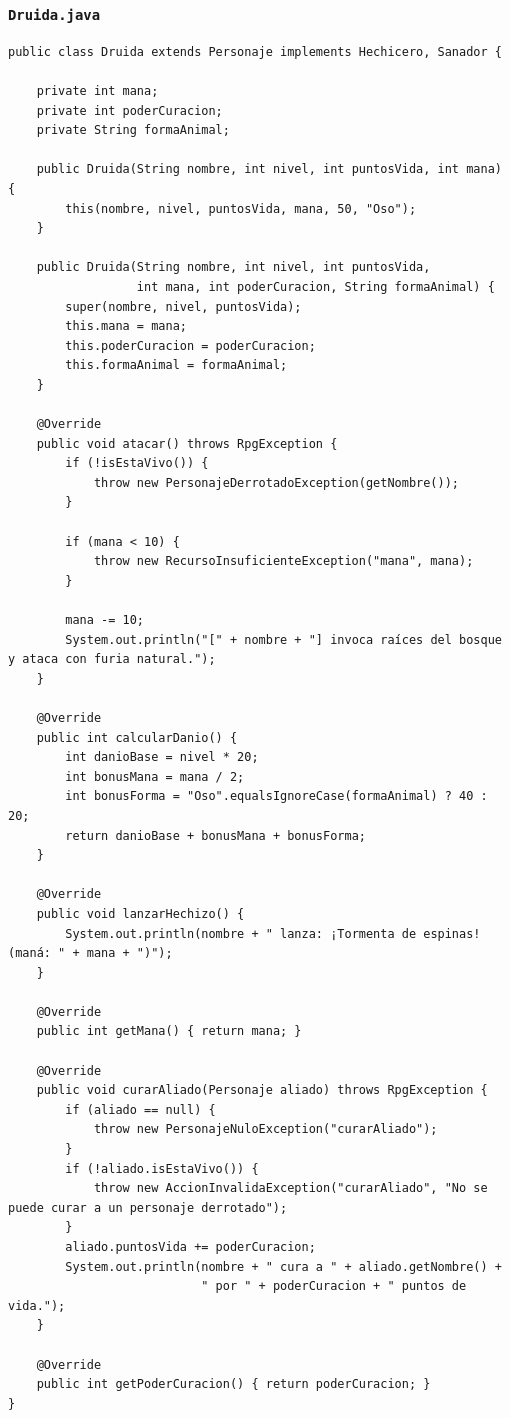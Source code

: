 \documentclass[11pt,letterpaper]{article}
\begin{document}
\subsubsection{\texttt{Druida.java}}
\begin{lstlisting}[style=JavaStyle]
public class Druida extends Personaje implements Hechicero, Sanador {

    private int mana;
    private int poderCuracion;
    private String formaAnimal;

    public Druida(String nombre, int nivel, int puntosVida, int mana) {
        this(nombre, nivel, puntosVida, mana, 50, "Oso");
    }

    public Druida(String nombre, int nivel, int puntosVida,
                  int mana, int poderCuracion, String formaAnimal) {
        super(nombre, nivel, puntosVida);
        this.mana = mana;
        this.poderCuracion = poderCuracion;
        this.formaAnimal = formaAnimal;
    }

    @Override
    public void atacar() throws RpgException {
        if (!isEstaVivo()) {
            throw new PersonajeDerrotadoException(getNombre());
        }

        if (mana < 10) {
            throw new RecursoInsuficienteException("mana", mana);
        }

        mana -= 10;
        System.out.println("[" + nombre + "] invoca raíces del bosque y ataca con furia natural.");
    }

    @Override
    public int calcularDanio() {
        int danioBase = nivel * 20;
        int bonusMana = mana / 2;
        int bonusForma = "Oso".equalsIgnoreCase(formaAnimal) ? 40 : 20;
        return danioBase + bonusMana + bonusForma;
    }

    @Override
    public void lanzarHechizo() {
        System.out.println(nombre + " lanza: ¡Tormenta de espinas! (maná: " + mana + ")");
    }

    @Override
    public int getMana() { return mana; }

    @Override
    public void curarAliado(Personaje aliado) throws RpgException {
        if (aliado == null) {
            throw new PersonajeNuloException("curarAliado");
        }
        if (!aliado.isEstaVivo()) {
            throw new AccionInvalidaException("curarAliado", "No se puede curar a un personaje derrotado");
        }
        aliado.puntosVida += poderCuracion;
        System.out.println(nombre + " cura a " + aliado.getNombre() +
                           " por " + poderCuracion + " puntos de vida.");
    }

    @Override
    public int getPoderCuracion() { return poderCuracion; }
}
\end{lstlisting}
\end{document}

